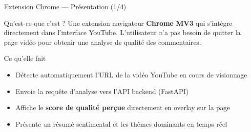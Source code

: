 \documentclass[aspectratio=169, 12pt]{beamer}
\begin{document}
\begin{frame}{Extension Chrome — Présentation (1/4)}

  \begin{block}{Qu'est-ce que c'est ?}
    \normalsize
    Une extension navigateur \textbf{Chrome MV3} qui s'intègre directement
    dans l'interface YouTube. L'utilisateur n'a pas besoin de quitter la
    page vidéo pour obtenir une analyse de qualité des commentaires.
  \end{block}

  \vspace{0.4cm}

  \begin{block}{Ce qu'elle fait}
    \begin{itemize}
      \item Détecte automatiquement l'URL de la vidéo YouTube en cours de visionnage
      \item Envoie la requête d'analyse vers l'API backend (FastAPI)
      \item Affiche le \textbf{score de qualité perçue} directement en overlay sur la page
      \item Présente un résumé sentimental et les thèmes dominants en temps réel
    \end{itemize}
  \end{block}

\end{frame}
\end{document}
